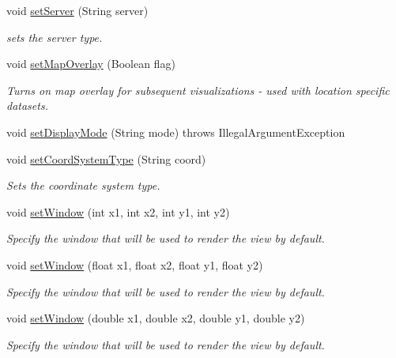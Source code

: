 \begin{DoxyCompactItemize}
void \hyperlink{classbridges_1_1connect_1_1_bridges_ab43e412448e1dfc340e58c407519a576}{set\+Server} (String server)
\begin{DoxyCompactList}\small\item\em sets the server type. \end{DoxyCompactList}\item 
void \hyperlink{classbridges_1_1connect_1_1_bridges_a4af383ba2f114ad7bd4e08eb44096973}{set\+Map\+Overlay} (Boolean flag)
\begin{DoxyCompactList}\small\item\em Turns on map overlay for subsequent visualizations -\/ used with location specific datasets. \end{DoxyCompactList}\item 
void \hyperlink{classbridges_1_1connect_1_1_bridges_aaa1a44a689daa26a841d0e8d31839861}{set\+Display\+Mode} (String mode)  throws Illegal\+Argument\+Exception 
\item 
void \hyperlink{classbridges_1_1connect_1_1_bridges_ade4a9c43e2b608e6b3dc774b73f95749}{set\+Coord\+System\+Type} (String coord)
\begin{DoxyCompactList}\small\item\em Sets the coordinate system type. \end{DoxyCompactList}\item 
void \hyperlink{classbridges_1_1connect_1_1_bridges_ac2f9a8d7852e499a7ed3521f06d470bf}{set\+Window} (int x1, int x2, int y1, int y2)
\begin{DoxyCompactList}\small\item\em Specify the window that will be used to render the view by default. \end{DoxyCompactList}\item 
void \hyperlink{classbridges_1_1connect_1_1_bridges_afff6882285f7615b775c59b2fc62b1c3}{set\+Window} (float x1, float x2, float y1, float y2)
\begin{DoxyCompactList}\small\item\em Specify the window that will be used to render the view by default. \end{DoxyCompactList}\item 
void \hyperlink{classbridges_1_1connect_1_1_bridges_a163a32a2fd3327c59d003f457e31eb63}{set\+Window} (double x1, double x2, double y1, double y2)
\begin{DoxyCompactList}\small\item\em Specify the window that will be used to render the view by default. \end{DoxyCompactList}\item 

\end{DoxyCompactItemize}
